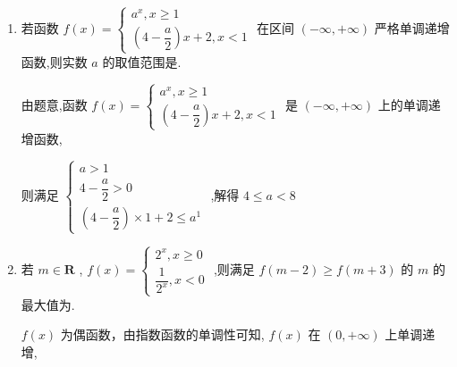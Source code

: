 \begin{enumerate}
\begin{jieda}
        综上, $t$ 的取值范围是 $\left( -\infty , - 2 \right \rbrack \cup \left\lbrack  {-\dfrac{1}{2}, + \infty  }\right)$ 
    \end{jieda}
    \item 若函数 $f\left( x\right)  = \left\{  \begin{array}{l} {a}^{x},x \geq  1 \\  \left( {4 - \dfrac{a}{2}}\right) x + 2,x < 1 \end{array}\right.$ 在区间 $\left( {-\infty , + \infty }\right)$ 严格单调递增函数,则实数 $a$ 的取值范围是\blkda[4]{$[4,8)$}. 
    \begin{jieda}
        由题意,函数 $f\left( x\right)  = \left\{  \begin{array}{l} {a}^{x},x \geq  1 \\  \left( {4 - \dfrac{a}{2}}\right) x + 2,x < 1 \end{array}\right.$ 是 $\left( {-\infty , + \infty }\right)$ 上的单调递增函数,
        
        则满足 $\left\{  \begin{array}{l} a > 1 \\  4 - \dfrac{a}{2} > 0 \\  \left( {4 - \dfrac{a}{2}}\right)  \times  1 + 2 \leq  {a}^{1} \end{array}\right.$ ,解得 $4 \leq  a < 8$
    \end{jieda}
    
    \item 若 $m \in  \mathbf{R}$ , $f\left( x\right)  = \left\{  \begin{array}{l} {2}^{x},x \geq  0 \\  \dfrac{1}{{2}^{x}},x < 0 \end{array}\right.$ ,则满足 $f\left( {m - 2}\right)  \geq  f\left( {m + 3}\right)$ 的 $m$ 的最大值为.
    \begin{jieda}
        $f\left( x\right)$ 为偶函数，由指数函数的单调性可知, $f\left( x\right)$ 在 $\left( {0, + \infty }\right)$ 上单调递增,
        

\end{jieda}
\end{enumerate}

